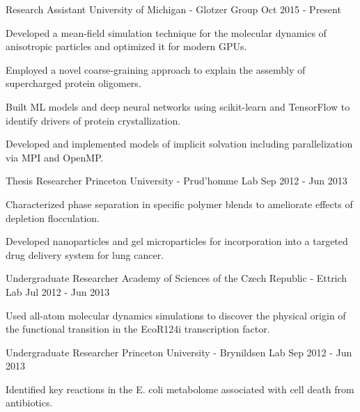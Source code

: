\begin{cventries}
  \cventry
    {Research Assistant} %
    {University of Michigan - Glotzer Group} %
    {} %
    {Oct 2015 - Present} %
{
      \begin{cvitems} %
        \item Developed a mean-field simulation technique for the molecular dynamics of anisotropic particles and optimized it for modern GPUs.
        \item Employed a novel coarse-graining approach to explain the assembly of supercharged protein oligomers.
        \item Built ML models and deep neural networks using scikit-learn and TensorFlow to identify drivers of protein crystallization.
        \item Developed and implemented models of implicit solvation including parallelization via MPI and OpenMP.
      \end{cvitems}
    }
  \cventry
    {Thesis Researcher} %
    {Princeton University - Prud'homme Lab} %
    {} %
    {Sep 2012 - Jun 2013} %
{
      \begin{cvitems} %
        \item Characterized phase separation in specific polymer blends to ameliorate effects of depletion flocculation.
        \item Developed nanoparticles and gel microparticles for incorporation into a targeted drug delivery system for lung cancer.
      \end{cvitems}
    }
  \cventry
    {Undergraduate Researcher} %
    {Academy of Sciences of the Czech Republic - Ettrich Lab} %
    {} %
    {Jul 2012 - Jun 2013} %
{
      \begin{cvitems} %
        \item Used all-atom molecular dynamics simulations to discover the physical origin of the functional transition in the EcoR124i transcription factor.
      \end{cvitems}
    }
  \cventry
    {Undergraduate Researcher} %
    {Princeton University - Brynildsen Lab} %
    {} %
    {Sep 2012 - Jun 2013} %
{
      \begin{cvitems} %
        \item Identified key reactions in the E. coli metabolome associated with cell death from antibiotics.

\end{cvitems}}
\end{cventries}

